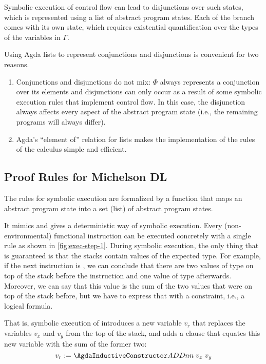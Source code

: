 Symbolic execution of control flow can lead to disjunctions over such
states, which is represented using a list of abstract program
states. Each of the branch comes with its own state, which requires
existential quantification over the types of the variables in $\Gamma$.
\AbstractUProgState

Using Agda lists to represent conjunctions and disjunctions is
convenient for two reasons.
\begin{enumerate}
\item Conjunctions and disjunctions do not mix: $\Phi$ always represents a conjunction over its elements
  and disjunctions can only occur as a result of some
  symbolic execution rules that implement control flow. 
  In this case, the disjunction always affects every aspect of the abstract program state
  (i.e., the remaining programs will always differ).
\item Agda's ``element of'' relation for lists makes the
  implementation of the rules of the calculus simple and efficient.
\end{enumerate}

\subsection{Proof Rules for Michelson DL}
\label{sec:calculus}

The rules for symbolic execution are formalized by a function that
maps an abstract program state into a set (list) of abstract program states.
\AbstractProgStep

It mimics  and gives a deterministic way of symbolic execution.
Every (non-environmental) functional instruction can be executed concretely
with a single rule as shown in \autoref{fig:exec-step-1}.
During symbolic execution, the only thing that is guaranteed is
that the stacks contain values of the expected type.
For example, if the next instruction is , we can conclude
that there are two values of type  on top of the stack
before the instruction and one value of type 
afterwards. Moreover, we can say that this value is the sum of the two
values that were on top of the stack before, but we have to express
that with a constraint, i.e., a logical formula.

That is, symbolic execution of  introduces a new variable $v_r$ that replaces the
variables $v_x$ and  $v_y$ from the top of the stack,
and adds a clause that equates this new variable with the sum of the former two:
\[	v_r := \ACon{ADDnn}\; v_x\; v_y
\]

